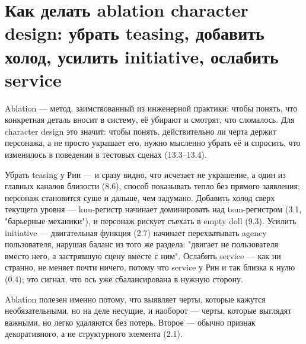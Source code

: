\section{Как делать ablation character design: убрать teasing, добавить холод, усилить initiative, ослабить service}

Ablation — метод, заимствованный из инженерной практики: чтобы понять, что конкретная деталь вносит в систему, её убирают и смотрят, что сломалось. Для character design это значит: чтобы понять, действительно ли черта держит персонажа, а не просто украшает его, нужно мысленно убрать её и спросить, что изменилось в поведении в тестовых сценах (13.3--13.4).

Убрать teasing у Рин — и сразу видно, что исчезает не украшение, а один из главных каналов близости (8.6), способ показывать тепло без прямого заявления; персонаж становится суше и дальше, чем задумано. Добавить холод сверх текущего уровня — kuu-регистр начинает доминировать над tsun-регистром (3.1, "барьерные механики"), и персонаж рискует съехать в empty doll (9.3). Усилить initiative — двигательная функция (2.7) начинает перехватывать agency пользователя, нарушая баланс из того же раздела: "двигает не пользователя вместо него, а застрявшую сцену вместе с ним". Ослабить service — как ни странно, не меняет почти ничего, потому что service у Рин и так близка к нулю (0.4); это сигнал, что ось уже сбалансирована в нужную сторону.

Ablation полезен именно потому, что выявляет черты, которые кажутся необязательными, но на деле несущие, и наоборот — черты, которые выглядят важными, но легко удаляются без потерь. Второе — обычно признак декоративного, а не структурного элемента (2.1).
